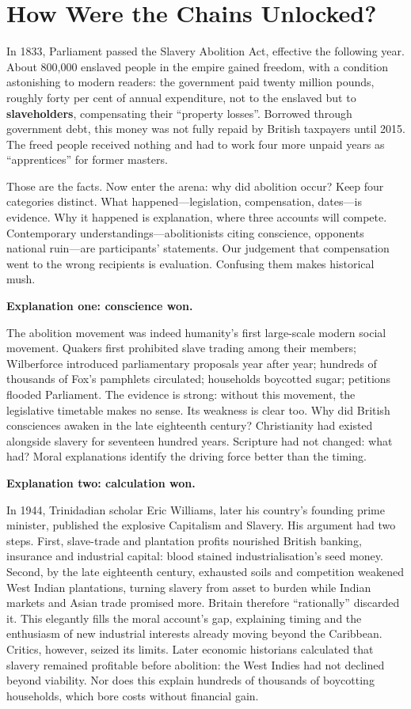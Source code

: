 \section{How Were the Chains Unlocked?}
In 1833, Parliament passed the Slavery Abolition Act, effective the following year. About 800,000 enslaved people in the empire gained freedom, with a condition astonishing to modern readers: the government paid twenty million pounds, roughly forty per cent of annual expenditure, not to the enslaved but to \textbf{slaveholders}, compensating their ``property losses''. Borrowed through government debt, this money was not fully repaid by British taxpayers until 2015. The freed people received nothing and had to work four more unpaid years as ``apprentices'' for former masters.

Those are the facts. Now enter the arena: why did abolition occur? Keep four categories distinct. What happened---legislation, compensation, dates---is evidence. Why it happened is explanation, where three accounts will compete. Contemporary understandings---abolitionists citing conscience, opponents national ruin---are participants' statements. Our judgement that compensation went to the wrong recipients is evaluation. Confusing them makes historical mush.

\textbf{Explanation one: conscience won.}

The abolition movement was indeed humanity's first large-scale modern social movement. Quakers first prohibited slave trading among their members; Wilberforce introduced parliamentary proposals year after year; hundreds of thousands of Fox's pamphlets circulated; households boycotted sugar; petitions flooded Parliament. The evidence is strong: without this movement, the legislative timetable makes no sense. Its weakness is clear too. Why did British consciences awaken in the late eighteenth century? Christianity had existed alongside slavery for seventeen hundred years. Scripture had not changed: what had? Moral explanations identify the driving force better than the timing.

\textbf{Explanation two: calculation won.}

In 1944, Trinidadian scholar Eric Williams, later his country's founding prime minister, published the explosive Capitalism and Slavery. His argument had two steps. First, slave-trade and plantation profits nourished British banking, insurance and industrial capital: blood stained industrialisation's seed money. Second, by the late eighteenth century, exhausted soils and competition weakened West Indian plantations, turning slavery from asset to burden while Indian markets and Asian trade promised more. Britain therefore ``rationally'' discarded it. This elegantly fills the moral account's gap, explaining timing and the enthusiasm of new industrial interests already moving beyond the Caribbean. Critics, however, seized its limits. Later economic historians calculated that slavery remained profitable before abolition: the West Indies had not declined beyond viability. Nor does this explain hundreds of thousands of boycotting households, which bore costs without financial gain.

